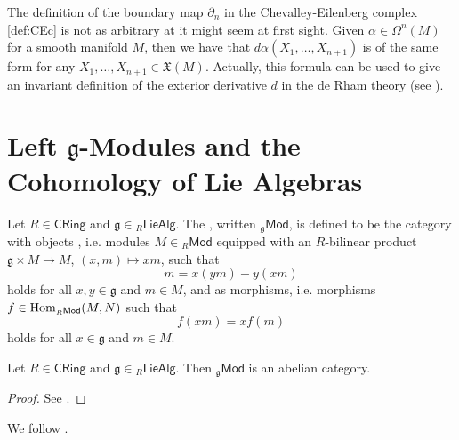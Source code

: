\begin{remark}
	The definition of the boundary map $\partial_n$ in the Chevalley-Eilenberg complex \ref{def:CEc} is not as arbitrary at it might seem at first sight. Given $\alpha \in \Omega^n(M)$ for a smooth manifold $M$, then we have that $d\alpha(X_1,\dots,X_{n + 1})$ is of the same form for any $X_1,\dots,X_{n + 1} \in \mathfrak{X}(M)$. Actually, this formula can be used to give an invariant definition of the exterior derivative $d$ in the de Rham theory (see \cite[370--372]{lee:smooth_manifolds:2013}).
\end{remark}

\section*{Left $\mathfrak{g}$-Modules and the Cohomology of Lie Algebras}

\begin{definition}
	Let $R \in \mathsf{CRing}$ and $\mathfrak{g} \in {_{R}\mathsf{LieAlg}}$. The , written $_{\mathfrak{g}}\mathsf{Mod}$, is defined to be the category with objects , i.e. modules $M \in {_{R}}\mathsf{Mod}$ equipped with an $R$-bilinear product $\mathfrak{g} \times M \to M$, $(x,m) \mapsto xm$, such that 
	\begin{equation*}
		[x,y]m = x(ym) - y(xm)
	\end{equation*}
	\noindent holds for all $x,y \in \mathfrak{g}$ and $m \in M$, and  as morphisms, i.e. morphisms $f \in \operatorname{Hom}_{_{R}\mathsf{Mod}}(M,N)$ such that 
	\begin{equation*}
		f(xm) = xf(m)
	\end{equation*}
	\noindent holds for all $x \in \mathfrak{g}$ and $m \in M$.
\end{definition}

\begin{proposition}
	Let $R \in \mathsf{CRing}$ and $\mathfrak{g} \in {_{R}\mathsf{LieAlg}}$. Then $_{\mathfrak{g}}\mathsf{Mod}$ is an abelian category.
\end{proposition}

\begin{proof}
	See \cite[220]{weibel:homological_algebra:1994}.
\end{proof}

We follow \cite[178]{kashiwara:categories:2006}.

